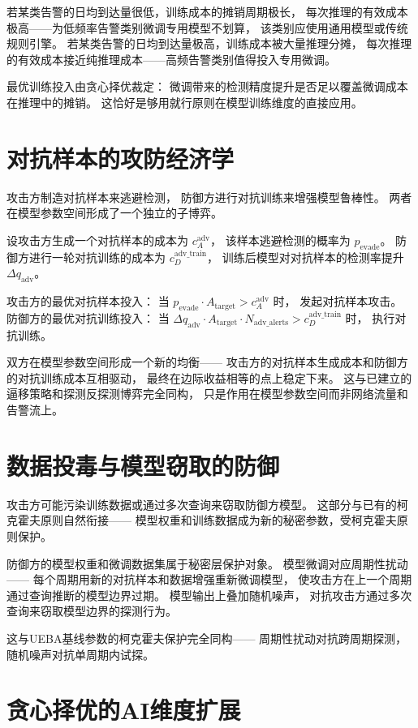 \documentclass[11pt,a4paper]{article}
\begin{document}
若某类告警的日均到达量很低，训练成本的摊销周期极长，
每次推理的有效成本极高——为低频率告警类别微调专用模型不划算，
该类别应使用通用模型或传统规则引擎。
若某类告警的日均到达量极高，训练成本被大量推理分摊，
每次推理的有效成本接近纯推理成本——高频告警类别值得投入专用微调。

最优训练投入由贪心择优裁定：
微调带来的检测精度提升是否足以覆盖微调成本在推理中的摊销。
这恰好是够用就行原则在模型训练维度的直接应用。

\section{对抗样本的攻防经济学}

攻击方制造对抗样本来逃避检测，
防御方进行对抗训练来增强模型鲁棒性。
两者在模型参数空间形成了一个独立的子博弈。

设攻击方生成一个对抗样本的成本为 \(c_A^{\text{adv}}\)，
该样本逃避检测的概率为 \(p_{\text{evade}}\)。
防御方进行一轮对抗训练的成本为 \(c_D^{\text{adv\_train}}\)，
训练后模型对对抗样本的检测率提升 \(\Delta q_{\text{adv}}\)。

攻击方的最优对抗样本投入：
当 \(p_{\text{evade}} \cdot A_{\text{target}} > c_A^{\text{adv}}\) 时，
发起对抗样本攻击。
防御方的最优对抗训练投入：
当 \(\Delta q_{\text{adv}} \cdot A_{\text{target}} \cdot N_{\text{adv\_alerts}} > c_D^{\text{adv\_train}}\) 时，
执行对抗训练。

双方在模型参数空间形成一个新的均衡——
攻击方的对抗样本生成成本和防御方的对抗训练成本互相驱动，
最终在边际收益相等的点上稳定下来。
这与已建立的逼移策略和探测反探测博弈完全同构，
只是作用在模型参数空间而非网络流量和告警流上。

\section{数据投毒与模型窃取的防御}

攻击方可能污染训练数据或通过多次查询来窃取防御方模型。
这部分与已有的柯克霍夫原则自然衔接——
模型权重和训练数据成为新的秘密参数，受柯克霍夫原则保护。

防御方的模型权重和微调数据集属于秘密层保护对象。
模型微调对应周期性扰动——
每个周期用新的对抗样本和数据增强重新微调模型，
使攻击方在上一个周期通过查询推断的模型边界过期。
模型输出上叠加随机噪声，
对抗攻击方通过多次查询来窃取模型边界的探测行为。

这与UEBA基线参数的柯克霍夫保护完全同构——
周期性扰动对抗跨周期探测，随机噪声对抗单周期内试探。

\section{贪心择优的AI维度扩展}
\end{document}

